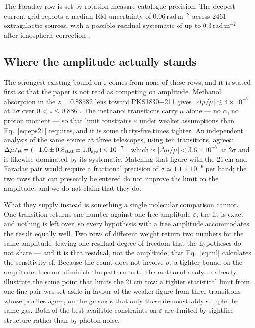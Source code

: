 \documentclass[aps,prd,twocolumn,superscriptaddress,nofootinbib,10pt]{revtex4-2}
\begin{document}
The Faraday row is set by rotation-measure catalogue precision. The deepest current grid reports a
median RM uncertainty of $0.06\,\mathrm{rad\,m^{-2}}$ across $2461$ extragalactic sources, with a
possible residual systematic of up to $0.3\,\mathrm{rad\,m^{-2}}$ after ionospheric correction
\citep{OSullivanLoTSS2023}.

\subsection{Where the amplitude actually stands}

The strongest existing bound on $\varepsilon$ comes from none of these rows, and it is stated first
so that the paper is not read as competing on amplitude. Methanol absorption in the $z = 0.88582$
lens toward PKS1830$-$211 gives $|\Delta\mu/\mu| \lesssim 4 \times 10^{-7}$ at $2\sigma$ over
$0 < z \leq 0.886$ \citep{KanekarMethanol2015}. The methanol transitions carry $\mu$ alone --- no
$\alpha$, no proton moment --- so that limit constrains $\varepsilon$ under weaker assumptions than
Eq.~\eqref{eq:eps21} requires, and it is some thirty-five times tighter. An independent analysis of
the same source at three telescopes, using ten transitions, agrees:
$\Delta\mu/\mu = (-1.0 \pm 0.8_{\rm stat} \pm 1.0_{\rm sys}) \times 10^{-7}$
\citep{BagdonaiteMethanol2013}, which is $|\Delta\mu/\mu| < 3.6 \times 10^{-7}$ at $2\sigma$ and is
likewise dominated by its systematic. Matching that figure with the $21\,$cm and Faraday pair would
require a fractional precision of $\sigma \simeq 1.1 \times 10^{-6}$ per band; the two rows that can
presently be entered do not improve the limit on the amplitude, and we do not claim that they do.

What they supply instead is something a single molecular comparison cannot. One transition returns
one number against one free amplitude $\varepsilon$; the fit is exact and nothing is left over, so
every hypothesis with a free amplitude accommodates the result equally well. Two rows of different
weight return two numbers for the same amplitude, leaving one residual degree of freedom that the
hypotheses do not share --- and it is that residual, not the amplitude, that Eq.~\eqref{eq:ml}
calculates the sensitivity of. Because the count does not involve $\sigma$, a tighter bound on the
amplitude does not diminish the pattern test. The methanol analyses already illustrate the same
point that limits the $21\,$cm row: a tighter statistical limit from one line pair was set aside in
favour of the weaker figure from three transitions whose profiles agree, on the grounds that only
those demonstrably sample the same gas. Both of the best available constraints on $\varepsilon$ are
limited by sightline structure rather than by photon noise.
\end{document}
